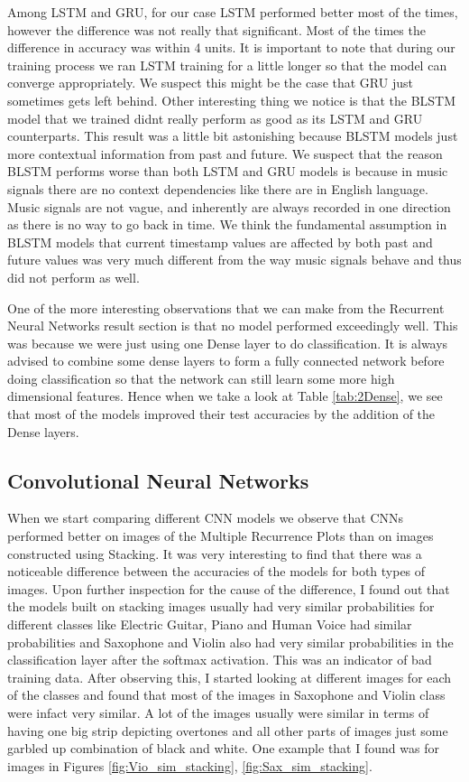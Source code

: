 \documentclass[letterpaper, 12 pt, conference]{ieeeconf}  %
\begin{document}
Among LSTM and GRU, for our case LSTM performed better most of the times, however the difference was not really that significant. Most of the times the difference in accuracy was within 4 units. It is important to note that during our training process we ran LSTM training for a little longer so that the model can converge appropriately. We suspect this might be the case that GRU just sometimes gets left behind. Other interesting thing we notice is that the BLSTM model that we trained didnt really perform as good as its LSTM and GRU counterparts. This result was a little bit astonishing because BLSTM models just more contextual information from past and future. We suspect that the reason BLSTM performs worse than both LSTM and GRU models is because in music signals there are no context dependencies like there are in English language. Music signals are not vague, and inherently are always recorded in one direction as there is no way to go back in time. We think the fundamental assumption in BLSTM models that current timestamp values are affected by both past and future values was very much different from the way music signals behave and thus did not perform as well.

One of the more interesting observations that we can make from the Recurrent Neural Networks result section is that no model performed exceedingly well. This was because we were just using one Dense layer to do classification. It is always advised to combine some dense layers to form a fully connected network before doing classification so that the network can still learn some more high dimensional features. Hence when we take a look at Table \ref{tab:2Dense}, we see that most of the models improved their test accuracies by the addition of the Dense layers.


\subsection{\textbf{Convolutional Neural Networks}}
When we start comparing different CNN models we observe that CNNs performed better on images of the Multiple Recurrence Plots than on images constructed using Stacking. It was very interesting to find that there was a noticeable difference between the accuracies of the models for both types of images. Upon further inspection for the cause of the difference, I found out that the models built on stacking images usually had very similar probabilities for different classes like Electric Guitar, Piano and Human Voice had similar probabilities and Saxophone and Violin also had very similar probabilities in the classification layer after the softmax activation. This was an indicator of bad training data. After observing this, I started looking at different images for each of the classes and found that most of the images in Saxophone and Violin class were infact very similar. A lot of the images usually were similar in terms of having one big strip depicting overtones and all other parts of images just some garbled up combination of black and white. One example that I found was for images in Figures \ref{fig:Vio_sim_stacking}, \ref{fig:Sax_sim_stacking}.
\end{document}
